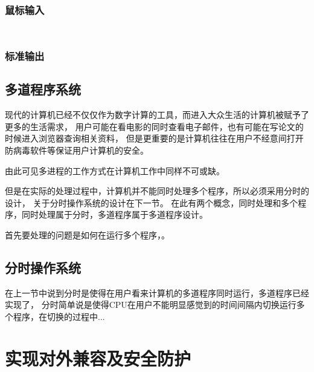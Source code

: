 \documentclass{swfcthesis}
\begin{document}
		\begin{listing}[H]
		\inputminted[tabsize=2, firstline=162, lastline=170,
		linenos=true]{c}{../ZOS/src/kernel/bootpack.c}
		\end{listing}
		
		\subsection{鼠标输入}

		\begin{listing}[H]
		\inputminted[tabsize=2, firstline=247, lastline=265,
		linenos=true]{c}{../ZOS/src/kernel/bootpack.c}
		\inputminted[tabsize=2, firstline=329, lastline=338,
		linenos=true]{c}{../ZOS/src/kernel/bootpack.c}
		\end{listing}

		\subsection{标准输出}
		
                
	\section{多道程序系统}

		现代的计算机已经不仅仅作为数字计算的工具，而进入大众生活的计算机被赋予了更多的生活需求，
		用户可能在看电影的同时查看电子邮件，也有可能在写论文的时候进入浏览器查询相关资料，
		但是更重要的是计算机往往在用户不经意间打开防病毒软件等保证用户计算机的安全\cite{tanenbaum2009modern}。

		由此可见多进程的工作方式在计算机工作中同样不可或缺。

		但是在实际的处理过程中，计算机并不能同时处理多个程序，所以必须采用分时的设计，
		关于分时操作系统的设计在下一节。
		在此有两个概念，同时处理和多个程序，同时处理属于分时，多道程序属于多道程序设计。

		首先要处理的问题是如何在运行多个程序，。

	\section{分时操作系统}

		在上一节中说到分时是使得在用户看来计算机的多道程序同时运行，多道程序已经实现了，
		分时简单说是使得CPU在用户不能明显感觉到的时间间隔内切换运行多个程序，在切换的过程中...
	
\chapter{实现对外兼容及安全防护}
\end{document}
